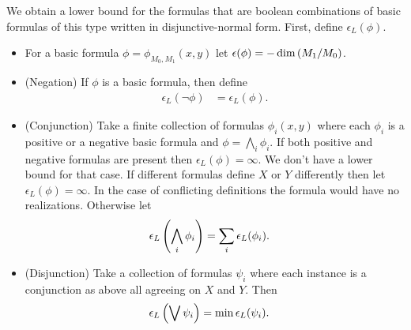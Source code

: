 We obtain a lower bound for the formulas that are boolean combinations of basic formulas of this type written in disjunctive-normal form.
First, define $\epsilon_L(\phi)$.

\begin{Definition}
  \begin{itemize}
  \item For a basic formula $\phi = \phi_{M_0, M_1}(x, y)$ let $\epsilon(\phi) = -\dim \left(M_1/M_0\right)$.
  \item (Negation)
    If $\phi$ is a basic formula, then define
    \begin{align*}
      \epsilon_L(\neg \phi) &= \epsilon_L(\phi).
    \end{align*}
  \item (Conjunction)
    Take a finite collection of formulas $\phi_i(x, y)$ where each $\phi_i$ is a positive or a negative basic formula
    and $\phi = \bigwedge_i\phi_i$.
    If both positive and negative formulas are present then $\epsilon_L(\phi) = \infty$.
    We don't have a lower bound for that case.
    If different formulas define $X$ or $Y$ differently then let $\epsilon_L(\phi) = \infty$.
    In the case of conflicting definitions the formula would have no realizations.
    Otherwise let
    \begin{align*}
      \epsilon_L\left(\bigwedge_i \phi_i\right) &= \sum_i \epsilon_L(\phi_i).
    \end{align*}
  \item  (Disjunction)
    Take a collection of formulas $\psi_i$ where each instance is a conjunction as above all agreeing on $X$ and $Y$.
    Then
    \begin{align*}
      \epsilon_L\left(\bigvee \psi_i\right) &= \min \epsilon_L(\psi_i).
    \end{align*}
  \end{itemize}
\end{Definition}

